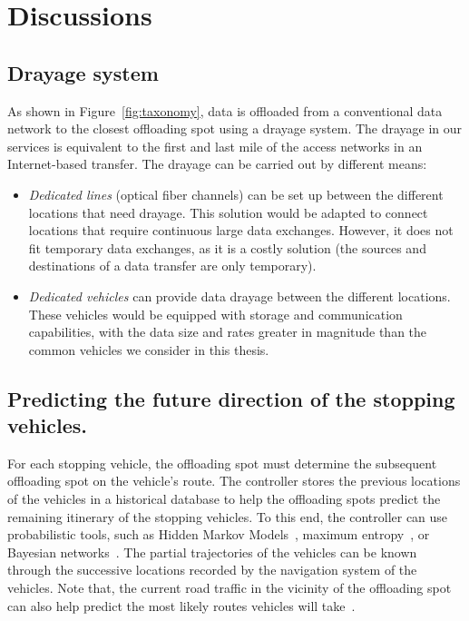 \section{Discussions}
\label{sec:discuss}

\subsection{Drayage system}
As shown in Figure~\ref{fig:taxonomy}, data is offloaded from a conventional data network to the closest offloading spot using a drayage system. The drayage in our services is equivalent to the first and last mile of the access networks in an Internet-based transfer. The drayage can be carried out by different means:

\begin{itemize}
    
    \item \textit{Dedicated lines} (\eg optical fiber channels) can be set up between the different locations that need drayage. This solution would be adapted to connect locations that require continuous large data exchanges. However, it does not fit temporary data exchanges, as it is a costly solution (\eg the sources and destinations of a data transfer are only temporary). 

    \item \textit{Dedicated vehicles} can provide data drayage between the different locations. These vehicles would be equipped with storage and communication capabilities, with the data size and rates greater in magnitude than the common vehicles we consider in this thesis.

\end{itemize}


\subsection{Predicting the future direction of the stopping vehicles.}
For each stopping vehicle, the offloading spot must determine the subsequent offloading spot on the vehicle's route. The controller stores the previous locations of the vehicles in a historical database to help the offloading spots predict the remaining itinerary of the stopping vehicles. To this end, the controller can use probabilistic tools, such as Hidden Markov Models~\cite{simmons2006learning}, maximum entropy~\cite{ziebart2008maximum}, or Bayesian networks~\cite{liao2007learning,krumm2006predestination}. The partial trajectories of the vehicles can be known through the successive locations recorded by the navigation system of the vehicles. Note that, the current road traffic in the vicinity of the offloading spot can also help predict the most likely routes vehicles will take~\cite{xue2009traffic}.

